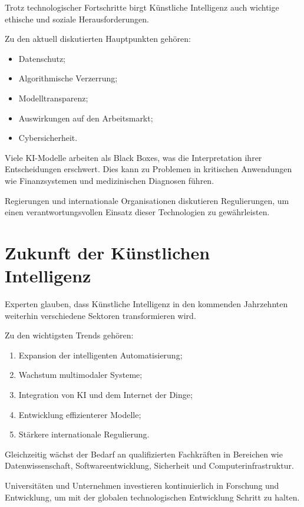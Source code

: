 \documentclass[11pt]{article}
\begin{document}
Trotz technologischer Fortschritte birgt Künstliche Intelligenz auch wichtige ethische und
soziale Herausforderungen.

Zu den aktuell diskutierten Hauptpunkten gehören:

\begin{itemize}
    \item Datenschutz;
    \item Algorithmische Verzerrung;
    \item Modelltransparenz;
    \item Auswirkungen auf den Arbeitsmarkt;
    \item Cybersicherheit.
\end{itemize}

Viele KI-Modelle arbeiten als Black Boxes, was die Interpretation ihrer Entscheidungen erschwert.
Dies kann zu Problemen in kritischen Anwendungen wie Finanzsystemen und medizinischen
Diagnosen führen.

Regierungen und internationale Organisationen diskutieren Regulierungen, um einen verantwortungsvollen
Einsatz dieser Technologien zu gewährleisten. 

\section{Zukunft der Künstlichen Intelligenz}

Experten glauben, dass Künstliche Intelligenz in den kommenden Jahrzehnten weiterhin verschiedene Sektoren
transformieren wird.

Zu den wichtigsten Trends gehören:

\begin{enumerate}
    \item Expansion der intelligenten Automatisierung;
    \item Wachstum multimodaler Systeme;
    \item Integration von KI und dem Internet der Dinge;
    \item Entwicklung effizienterer Modelle;
    \item Stärkere internationale Regulierung.
\end{enumerate}

Gleichzeitig wächst der Bedarf an qualifizierten Fachkräften in Bereichen wie
Datenwissenschaft, Softwareentwicklung, Sicherheit und Computerinfrastruktur.

Universitäten und Unternehmen investieren kontinuierlich in Forschung und Entwicklung, um
mit der globalen technologischen Entwicklung Schritt zu halten. 
\end{document}
